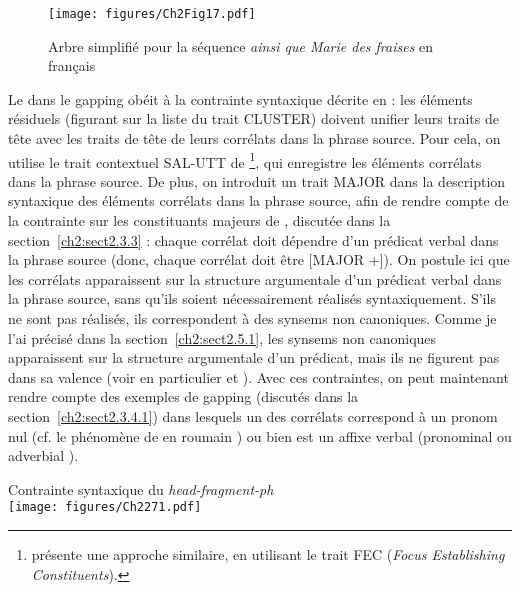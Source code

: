 \begin{figure} 

\texttt{[image: figures/Ch2Fig17.pdf]}%

\caption{Arbre simplifié pour la séquence \textit{ainsi que Marie des fraises} en français}
\label{ch2:fig17}
\end{figure}

Le  dans le gapping obéit à la contrainte syntaxique décrite en  : les éléments résiduels (figurant sur la liste du trait CLUSTER) doivent unifier leurs traits de tête avec les traits de tête de leurs corrélats dans la phrase source. Pour cela, on utilise le trait contextuel SAL-UTT de \citet{GinzburgEtAl2000}\footnote{
 \citet{Ginzburg2012} présente une approche similaire, en utilisant le trait FEC (\textit{Focus Establishing Constituents}).}, qui enregistre les éléments corrélats dans la phrase source. De plus, on introduit un trait MAJOR dans la description syntaxique des éléments corrélats dans la phrase source, afin de rendre compte de la contrainte sur les constituants majeurs de \citet{Hankamer1971}, discutée dans la section~\ref{ch2:sect2.3.3} : chaque corrélat doit dépendre d’un prédicat verbal dans la phrase source (donc, chaque corrélat doit être [MAJOR +]). On postule ici que les corrélats apparaissent sur la structure argumentale d’un prédicat verbal dans la phrase source, sans qu’ils soient nécessairement réalisés syntaxiquement. S’ils ne sont pas réalisés, ils correspondent à des synsems non canoniques. Comme je l’ai précisé dans la section~\ref{ch2:sect2.5.1}, les synsems non canoniques apparaissent sur la structure argumentale d’un prédicat, mais ils ne figurent pas dans sa valence (voir en particulier  et ). Avec ces contraintes, on peut maintenant rendre compte des exemples de gapping (discutés dans la section~\ref{ch2:sect2.3.4.1}) dans lesquels un des corrélats correspond à un pronom nul (cf. le phénomène de  en roumain ) ou bien est un affixe verbal (pronominal  ou adverbial ).   

\ea \label{ch2:ex271}
Contrainte syntaxique du \textit{head-fragment-ph}\\
\texttt{[image: figures/Ch2271.pdf]}


